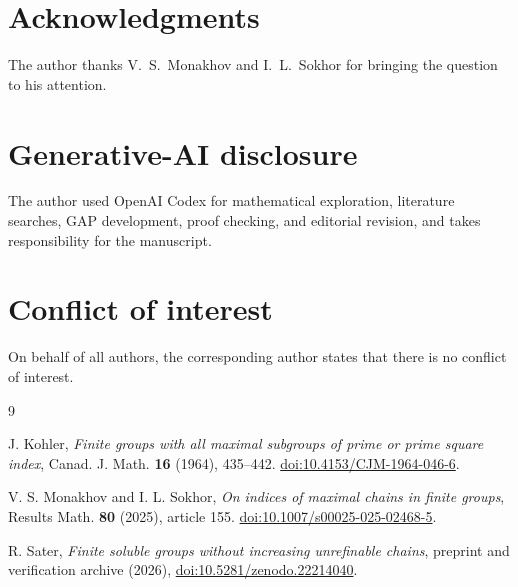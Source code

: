 \documentclass[11pt]{amsart}
\begin{document}
\section*{Acknowledgments}

The author thanks V.~S.~Monakhov and I.~L.~Sokhor for bringing the question
to his attention.

\section*{Generative-AI disclosure}

The author used OpenAI Codex for mathematical exploration, literature
searches, GAP development, proof checking, and editorial revision, and takes
responsibility for the manuscript.

\section*{Conflict of interest}

On behalf of all authors, the corresponding author states that there is no
conflict of interest.

\begin{thebibliography}{9}

J. Kohler,
\emph{Finite groups with all maximal subgroups of prime or prime square
index},
Canad. J. Math. \textbf{16} (1964), 435--442.
\href{https://doi.org/10.4153/CJM-1964-046-6}{doi:10.4153/CJM-1964-046-6}.

V. S. Monakhov and I. L. Sokhor,
\emph{On indices of maximal chains in finite groups},
Results Math. \textbf{80} (2025), article 155.
\href{https://doi.org/10.1007/s00025-025-02468-5}{doi:10.1007/s00025-025-02468-5}.

R. Sater,
\emph{Finite soluble groups without increasing unrefinable chains},
preprint and verification archive (2026),
\href{https://doi.org/10.5281/zenodo.22214040}{doi:10.5281/zenodo.22214040}.

\end{thebibliography}
\end{document}
